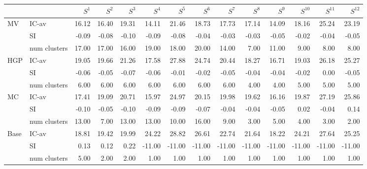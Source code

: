 \begin{tabular}{llrrrrrrrrrrrr}
\toprule
 &  & $S^{1}$ & $S^{2}$ & $S^{3}$ & $S^{4}$ & $S^{5}$ & $S^{6}$ & $S^{7}$ & $S^{8}$ & $S^{9}$ & $S^{10}$ & $S^{11}$ & $S^{12}$ \\
\midrule
\multirow[c]{3}{*}{MV} & IC-av & 16.12 & 16.40 & 19.31 & 14.11 & 21.46 & 18.73 & 17.73 & 17.14 & 14.09 & 18.16 & 25.24 & 23.19 \\
 & SI & -0.09 & -0.08 & -0.10 & -0.09 & -0.08 & -0.04 & -0.03 & -0.03 & -0.05 & -0.02 & -0.04 & -0.05 \\
 & num clusters & 17.00 & 17.00 & 16.00 & 19.00 & 18.00 & 20.00 & 14.00 & 7.00 & 11.00 & 9.00 & 8.00 & 8.00 \\
\multirow[c]{3}{*}{HGP} & IC-av & 19.05 & 19.66 & 21.26 & 17.58 & 27.88 & 24.74 & 20.44 & 18.27 & 16.71 & 19.03 & 26.18 & 25.27 \\
 & SI & -0.06 & -0.05 & -0.07 & -0.06 & -0.01 & -0.02 & -0.05 & -0.04 & -0.04 & -0.02 & 0.00 & -0.05 \\
 & num clusters & 6.00 & 6.00 & 6.00 & 6.00 & 6.00 & 6.00 & 6.00 & 4.00 & 4.00 & 5.00 & 5.00 & 5.00 \\
\multirow[c]{3}{*}{MC} & IC-av & 17.41 & 19.09 & 20.71 & 15.97 & 24.97 & 20.15 & 19.98 & 19.62 & 16.16 & 19.87 & 27.19 & 25.86 \\
 & SI & -0.10 & -0.05 & -0.10 & -0.09 & -0.09 & -0.07 & -0.04 & -0.04 & -0.05 & 0.02 & -0.04 & 0.14 \\
 & num clusters & 13.00 & 7.00 & 13.00 & 13.00 & 10.00 & 16.00 & 9.00 & 3.00 & 5.00 & 4.00 & 3.00 & 2.00 \\
\multirow[c]{3}{*}{Base} & IC-av & 18.81 & 19.42 & 19.99 & 24.22 & 28.82 & 26.61 & 22.74 & 21.64 & 18.22 & 24.21 & 27.64 & 25.25 \\
 & SI & 0.13 & 0.12 & 0.22 & -11.00 & -11.00 & -11.00 & -11.00 & -11.00 & -11.00 & -11.00 & -11.00 & -11.00 \\
 & num clusters & 5.00 & 2.00 & 2.00 & 1.00 & 1.00 & 1.00 & 1.00 & 1.00 & 1.00 & 1.00 & 1.00 & 1.00 \\
\bottomrule
\end{tabular}
